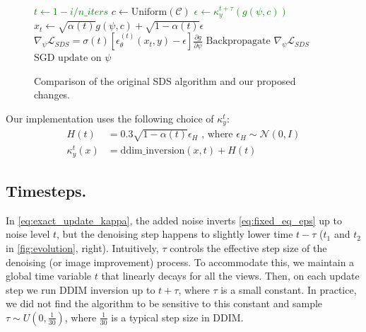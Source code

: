 \begin{figure}[h!]
\begin{minipage}{.5\textwidth}
\begin{algorithm}[H]
\begin{algorithmic}
                    \State \textcolor{Green}{$t  \gets 1 - i / n\_iters$}   
                    \State $c \gets \text{Uniform}(\mathcal{C})$   
                    \State \textcolor{Green}{$\epsilon \gets \kappa^{t + \tau}_y(g(\psi, c))$} %
                    \State $x_t \gets \sqrt{\alpha(t)} g(\psi, c) + \sqrt{1 - \alpha(t)}\epsilon$ 
                    \State $\nabla_\psi\mathcal{L}_{SDS} = \sigma(t) \left[\epsilon_\theta^{(t)}\left(x_t, y\right)  - \epsilon \right] \frac{\partial g}{\partial \psi}$   
                    \State $\text{Backpropagate } \nabla_\psi\mathcal{L}_{SDS}$
                    \State $\text{SGD update on } \psi$
                \EndFor
                \EndProcedure
            \end{algorithmic}
        \end{algorithm}
    \end{minipage}
    \caption{
        Comparison of the original SDS algorithm and our proposed changes.
    }
    \label{alg:conparison}
\end{figure}

Our implementation uses the following choice of $\kappa^t_y$:
\begin{equation}
    \begin{split}
    H(t) &= 0.3 \sqrt{1  - \alpha(t)} \epsilon_{H} \text{~, where~} \epsilon_{H} \sim \mathcal{N}(0, I)\\
        \kappa^{t}_y(x) &= \textrm{ddim\_inversion}(x, t) + H(t)
    \end{split}
    \label{eq:our_kappa}
\end{equation}

\subsection{Timesteps.}
In \cref{eq:exact_update_kappa}, the added noise inverts \cref{eq:fixed_eq_eps} up to noise level $t$, but the denoising step happens to slightly lower time $t - \tau$ ($t_1$ and $t_2$ in \cref{fig:evolution}, right).
Intuitively, $\tau$ controls the effective step size of the denoising (or image improvement) process.
To accommodate this, we maintain a global time variable $t$ that linearly decays for all the views.
Then, on each update step we run DDIM inversion up to $t + \tau$, where $\tau$ is a small constant.
In practice, we did not find the algorithm to be sensitive to this constant and sample $\tau\sim U(0, \frac{1}{30})$, where $\frac{1}{30}$ is a typical step size in DDIM.



